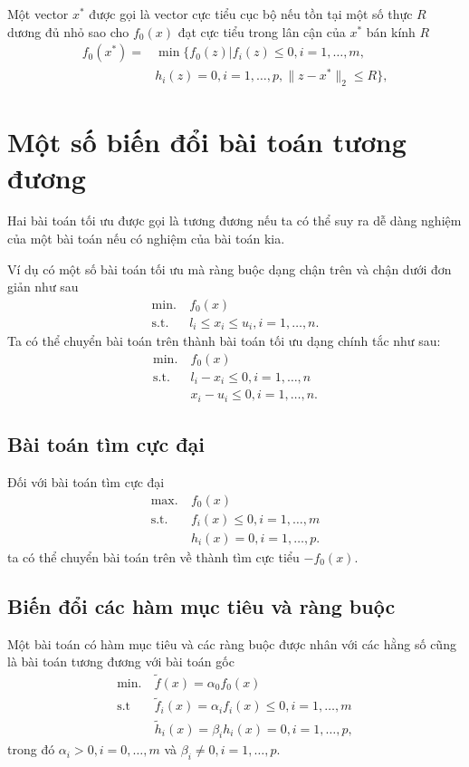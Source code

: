 \documentclass{book}
\begin{document}
Một vector $x^*$ được gọi là vector cực tiểu cục bộ nếu tồn tại một số thực $R$ dương đủ nhỏ sao cho $f_0(x)$ đạt cực tiểu trong lân cận của $x^*$ bán kính $R$
\begin{align*}
f_0(x^*) = & \min \{f_0(z) | f_i(z)  \leq 0, i = 1, \ldots, m, \\
		& h_i(z) = 0, i = 1, \ldots, p, \|z - x^* \|_2 \leq R \},
\end{align*}

\section{Một số biến đổi bài toán tương đương}
Hai bài toán tối ưu được gọi là tương đương nếu ta có thể suy ra dễ dàng nghiệm của một bài toán nếu có nghiệm của bài toán kia.

Ví dụ có một số bài toán tối ưu mà ràng buộc dạng chận trên và chận dưới đơn giản như sau
\begin{align*}
\mathrm{min.}~ & f_0(x)\\
\mathrm{s.t.}~ & l_i \leq x_i \leq u_i, i = 1, \ldots, n.
\end{align*}
Ta có thể chuyển bài toán trên thành bài toán tối ưu dạng chính tắc như sau:
\begin{align*}
\mathrm{min.}~ & f_0(x)\\
\mathrm{s.t.}~ & l_i-  x_i \leq 0, i = 1, \ldots, n\\
			& x_i - u_i \leq 0, i = 1, \ldots, n.
\end{align*}

\subsection*{Bài toán tìm cực đại}
Đối với bài toán tìm cực đại
\begin{align*}
\mathrm{max.} ~ & f_0(x)\\
\mathrm{s.t.} ~ & f_i(x) \leq 0, i = 1, \ldots, m \\
			& h_i(x) = 0, i = 1, \ldots, p.
\end{align*}
ta có thể chuyển bài toán trên về thành tìm cực tiểu $- f_0(x)$.

\subsection*{Biến đổi các hàm mục tiêu và ràng buộc}
Một bài toán có hàm mục tiêu và các ràng buộc được nhân với các hằng số cũng là bài toán tương đương với bài toán gốc 
\begin{align*}
\mathrm{min.} ~ & \tilde{f}(x) = \alpha_0 f_0(x)\\
\mathrm{s.t} ~ & \tilde{f}_i (x) = \alpha_i f_i(x) \leq 0, i = 1, \ldots, m \\
			& \tilde{h}_i(x) = \beta_i h_i(x) = 0, i = 1, \ldots, p,
\end{align*}
trong đó $\alpha_i > 0, i=0, \ldots, m$ và $\beta_i \neq 0, i=1, \ldots, p$.
\end{document}
